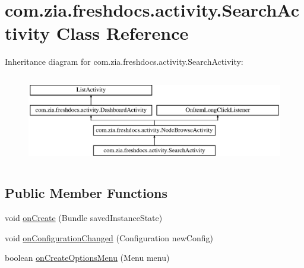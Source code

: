 \hypertarget{classcom_1_1zia_1_1freshdocs_1_1activity_1_1_search_activity}{\section{com.\-zia.\-freshdocs.\-activity.\-Search\-Activity Class Reference}
\label{classcom_1_1zia_1_1freshdocs_1_1activity_1_1_search_activity}
}
Inheritance diagram for com.\-zia.\-freshdocs.\-activity.\-Search\-Activity\-:\begin{figure}[H]
\begin{center}
\leavevmode
\includegraphics[height=3.929825cm]{classcom_1_1zia_1_1freshdocs_1_1activity_1_1_search_activity}
\end{center}
\end{figure}
\subsection*{Public Member Functions}
\begin{DoxyCompactItemize}
\item 
void \hyperlink{classcom_1_1zia_1_1freshdocs_1_1activity_1_1_search_activity_a1101b6570eff15803f48d5b801c7496a}{on\-Create} (Bundle saved\-Instance\-State)
\item 
void \hyperlink{classcom_1_1zia_1_1freshdocs_1_1activity_1_1_search_activity_af50489c27582fc745cff441e48c19278}{on\-Configuration\-Changed} (Configuration new\-Config)
\item 
boolean \hyperlink{classcom_1_1zia_1_1freshdocs_1_1activity_1_1_search_activity_a5e3e400d3ac7db5bffd2863b07037a09}{on\-Create\-Options\-Menu} (Menu menu)
\end{DoxyCompactItemize}
